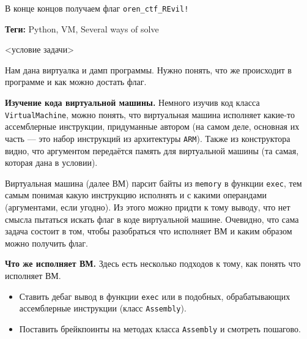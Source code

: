\documentclass[idxtotoc,hyperref,openany,oneside]{files/reverse} %
\begin{document}
В конце концов получаем флаг \verb|oren_ctf_REvil!|




\textbf{Теги:} Python, VM, Several ways of solve\vspace{\baselineskip}

\begin{tcolorbox}
<условие задачи>
\end{tcolorbox}

Нам дана виртуалка и дамп программы. Нужно понять, что же происходит в программе и как можно достать флаг.

\textbf{Изучение кода виртуальной машины.}
Немного изучив код класса \verb|VirtualMachine|, можно понять, что виртуальная машина исполняет какие-то ассемблерные инструкции, придуманные автором (на самом деле, основная их часть — это набор инструкций из архитектуры \verb|ARM|). Также из конструктора видно, что аргументом передаётся память для виртуальной машины (та самая, которая дана в условии).

Виртуальная машина (далее ВМ) парсит байты из \verb|memory| в функции \verb|exec|, тем самым понимая какую инструкцию исполнять и с какими операндами (аргументами, если угодно). Из этого можно придти к тому выводу, что нет смысла пытаться искать флаг в коде виртуальной машине. Очевидно, что сама задача состоит в том, чтобы разобраться что исполняет ВМ и каким образом можно получить флаг.

\textbf{Что же исполняет ВМ.}
Здесь есть несколько подходов к тому, как понять что исполняет ВМ.
\begin{itemize}
\item Ставить дебаг вывод в функции \verb|exec| или в подобных, обрабатывающих ассемблерные инструкции (класс \verb|Assembly|).
\item Поставить брейкпоинты на методах класса \verb|Assembly| и смотреть пошагово.
\end{itemize}
\end{document}
